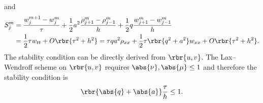 \documentclass[english, nochinese]{pnote}
\begin{document}
and
\begin{equation}
\begin{split}
S_j^m &= \frac{ w_j^{ m + 1 } - w_j^m }{\tau} + \frac{1}{2} a^2 \frac{ \rho_{ j + 1 }^m - \rho_{ j - 1 }^m }{h} + \frac{1}{2} q \frac{ w_{ j + 1 }^m - w_{ j - 1 }^m }{h} \\
&= \frac{1}{2} \tau w_{ t t } + O \rbr{ \tau^2 + h^2 } = \tau q a^2 \rho_{ x x } + \frac{1}{2} \tau \rbr{ q^2 + a^2 } w_{ x x } + O \rbr{ \tau^2 + h^2 }.
\end{split}
\end{equation}
The stability condition can be directly derived from $ \rbr{ u, v } $. The Lax--Wendroff scheme on $ \rbr{ u, v } $ requires $ \abs{\nu}, \abs{\mu} \le 1 $ and therefore the stability condition is
\begin{equation}
\rbr{ \abs{q} + \abs{a} } \frac{\tau}{h} \le 1.
\end{equation}
\end{document}
